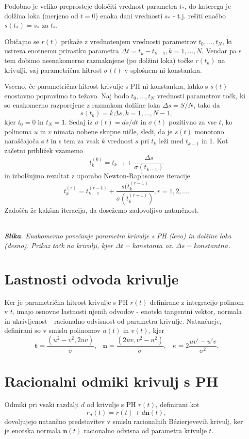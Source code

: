 \documentclass[a4paper]{article}
\begin{document}
	Podobno je veliko preprosteje določiti vrednost parametra $t_*$, do katerega je dolžina loka (merjeno od $t = 0$) enaka dani vrednosti $s_*$ - t.j. rešiti enačbo $s (t_*) = s_*$ za $t_*$.
	
	Običajno se $r (t)$ prikaže z vrednotenjem vrednosti parametrov $t_0,\ldots , t_N$, ki ustreza enotnemu prirastku parametra $\Delta t = t_k- t_{k- 1}, k = 1,\ldots , N$. Vendar pa s tem dobimo neenakomerno razmaknjene (po dolžini loka) točke $r (t_k)$ na krivulji, saj parametrična hitrost $\sigma (t)$ v splošnem ni konstantna.
	
	Vseeno, če parametrična hitrost krivulje s PH ni konstantna, lahko s $s (t)$ enostavno popravimo to težavo. Naj bodo $t_0,\ldots, t_N$ vrednosti parametrov točk, ki so enakomerno razporejene z razmakom dolžine loka $\Delta s = S / N$, tako da
	$$s (t_k) = k\Delta s, k = 1,\ldots , N - 1,$$
	kjer $t_0 = 0$ in $t_N = 1$. Sedaj iz $\sigma (t) = ds / dt$ in $\sigma (t)$ pozitivno za vse $t$, ko polinoma $u$ in $v$ nimata nobene skupne ničle, sledi, da je $s (t)$ monotono naraščajoča s $t$ in s tem za vsak $k$ vrednost $s$ pri $t_k$ leži med $t_{k - 1}$ in 1. Kot začetni približek vzamemo
	$$t^{(0)}_k = t_{k-1}+\frac{\Delta s}{\sigma(t_{k-1})}$$
	in izbolšujmo rezultat z uporabo Newton-Raphsonove iteracije
	$$t^{(r)}_k = t^{(r-1)}_{k-1}+\frac{s(t^{(r-1)}_k}{\sigma(t^{(r-1)}_k)}, r = 1, 2,\ldots.$$
	Zadošča že kakšna iteracija, da dosežemo zadovoljivo natančnost.
	
	
	\textit{\\ \textbf{Slika}. Enakomerno povečanje parametra krivulje s PH (levo) in dolžine loka (desno). Prikaz točk na krivulji, kjer $\Delta t = konstanta$ oz. $\Delta s = konstantna$.}
	
	\section{Lastnosti odvoda krivulje}
	Ker je parametrična hitrost krivulje s PH $r (t)$ definirane z integracijo polinom v $t$, imajo osnovne lastnosti njenih odvodov - enotski tangentni vektor, normala in ukrivljenost - racionalno odvisnost od parametra krivulje. Natančneje, definirani so v smislu polinomov $u (t)$ in $v (t)$, kjer
	$$\textbf{t} =\frac{(u^2 - v^2, 2uv)}{\sigma},\hspace{10pt} \textbf{n} =\frac{(2uv, v^2 - u^2)}{\sigma},\hspace{10pt} \kappa = 2 \frac{uv\prime - u\prime v}{\sigma^2}.$$
	
	\section{Racionalni odmiki krivulj s PH}
	Odmiki pri vsaki razdalji $d$ od krivulje s PH $r (t)$, definirani kot
	$$r_d (t) = r (t) + d \textbf{n} (t),$$
	dovoljujejo natančno predstavitev v smislu racionalnih B\'ezierjevevih krivulj, ker je enotska normala $\textbf{n} (t)$ racionalno odvisna od parametra krivulje $t$. 
	
\end{document}
